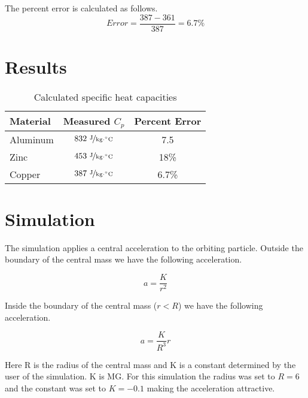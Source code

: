 \documentclass{article}
\begin{document}
The percent error is calculated as follows.
$$Error=\frac{387-361}{387}=6.7\%$$



\section{Results}

\begin{table}[htbp]
\begin{center}
\footnotesize
\begin{tabular}{lcc}
\toprule
 Material  & Measured $C_p$ & Percent Error\\                                                      
\midrule
  
    Aluminum   & $832\   \nicefrac{ \text{J}}{\text{kg}\cdot {}^{\circ}\text{C}}$ &   7.5   \\
    Zinc     & $453\  \nicefrac{ \text{J}}{\text{kg}\cdot {}^{\circ}\text{C}}$  & 18\%   \\
     Copper     & $387\   \nicefrac{ \text{J}}{\text{kg}\cdot {}^{\circ}\text{C}}$   & 6.7\%   \\
    
\bottomrule
\end{tabular}
\end{center}
  \caption{Calculated specific heat capacities}
  \label{tab:font-sizes}
\end{table}


 

\section{Simulation}

The simulation applies a central acceleration to the orbiting particle.  Outside the boundary of the central mass we have the following acceleration.

$$a=\frac{K}{r^2}$$

Inside the boundary of the central mass ($r<R$) we have the following acceleration.

$$a=\frac{K}{R^3}r$$

Here R is the radius of the central mass and K is a constant determined by the user of the simulation.  K is MG.  For this simulation the radius was set to $R=6$ and the constant was set to $K=-0.1$ making the acceleration attractive.\\
\end{document}
